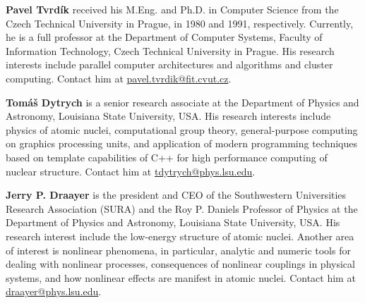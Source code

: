 \documentclass[10pt,a4paper]{article}
\theoremstyle{definition}\newtheorem{problem}{Problem}
\begin{document}
\vspace{1em}
\noindent\textbf{Pavel Tvrd\'{i}k}
received his M.Eng. and Ph.D. in Computer Science from the Czech Technical University in Prague, in 1980 and 1991, respectively. Currently, he is a full professor at the Department of Computer Systems, Faculty of Information Technology, Czech Technical University in Prague.
His research interests include parallel computer architectures and algorithms and cluster computing.
Contact him at \href{mailto:pavel.tvrdik@fit.cvut.cz}{pavel.tvrdik@fit.cvut.cz}.

\vspace{5em}
\noindent\textbf{Tom\'{a}\v{s} Dytrych}
is a senior research associate at the Department of Physics and Astronomy, Louisiana State University, USA.
His research interests include physics of atomic nuclei, computational group theory, general-purpose computing on graphics processing units, and application of modern programming techniques based on template capabilities of C++ for high performance computing of nuclear structure.
Contact him at \href{mailto:tdytrych@phys.lsu.edu}{tdytrych@phys.lsu.edu}.

\vspace{2.6em}
\noindent\textbf{Jerry P. Draayer}
is the president and CEO of the Southwestern Universities Research Association (SURA) and the Roy P. Daniels Professor of Physics at the Department of Physics and Astronomy, Louisiana State University, USA.
His research interest include the low-energy structure of atomic nuclei. Another area of interest is nonlinear phenomena, in particular, analytic and numeric tools for dealing with nonlinear processes, consequences of nonlinear couplings in physical systems, and how nonlinear effects are manifest in atomic nuclei.
Contact him at \href{mailto:draayer@phys.lsu.edu}{draayer@phys.lsu.edu}.
\end{document}

